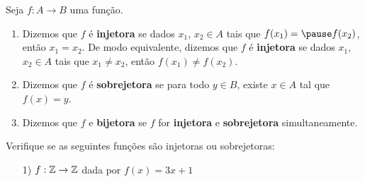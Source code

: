 \documentclass{beamer}
\begin{document}
    \begin{frame}
        \begin{definicao}
            Seja $f : A \to B$ uma fun\c{c}\~ao.\pause
            \begin{enumerate}[label={\roman*})]
                \item Dizemos que $f$ \'e \textbf{injetora} \pause se dados $x_1$, \pause $x_2 \in A$ \pause tais que $f(x_1) = \pause f(x_2)$, \pause ent\~ao $x_1 = x_2$. \pause De modo equivalente, \pause dizemos que $f$ é \textbf{injetora} \pause se dados $x_1$, \pause $x_2 \in A$ \pause tais que $x_1 \ne x_2$, \pause ent\~ao $f(x_1) \ne f(x_2)$.\pause

                \vspace{.3cm}

                \item Dizemos que $f$ \'e \textbf{sobrejetora} \pause se para todo $y \in B$, \pause existe $x \in A$ \pause tal que $f(x) = y$.\pause

                \vspace{.3cm}

                \item Dizemos que $f$ e \textbf{bijetora} \pause se $f$ for \textbf{injetora} \pause e \textbf{sobrejetora} \pause simultaneamente.\pause

                \vspace{.3cm}
            \end{enumerate}
        \end{definicao}
    \end{frame}

    \begin{frame}
        \begin{exemplos}
            Verifique se as seguintes fun\c{c}\~oes s\~ao injetoras \pause ou sobrejetoras:\pause
            \begin{enumerate}
                \item[1)] $f : \mathbb{Z} \to \mathbb{Z}$ dada por $f(x) = 3x + 1$
            \end{enumerate}
        \end{exemplos}

        \vspace{5cm}
    \end{frame}

    \begin{frame}
        \vspace{5cm}
    \end{frame}
\end{document}
